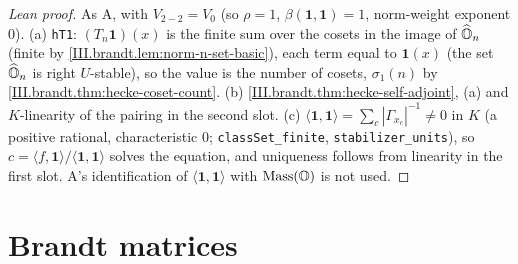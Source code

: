 \begin{proof}[Lean proof]
As A, with $V_{2-2}=V_0$ (so $\rho=1$, $\beta(\mathbf 1,\mathbf 1)=1$, norm-weight exponent $0$). (a) \texttt{hT1}: $(T_n\mathbf 1)(x)$ is the finite sum over the cosets in the image of $\widehat{\mathbb{O}}_n$ (finite by \cref{III.brandt.lem:norm-n-set-basic}), each term equal to $\mathbf 1(x)$ (the set $\widehat{\mathbb{O}}_n$ is right $U$-stable), so the value is the number of cosets, $\sigma_1(n)$ by \cref{III.brandt.thm:hecke-coset-count}. (b) \cref{III.brandt.thm:hecke-self-adjoint}, (a) and $K$-linearity of the pairing in the second slot. (c) $\langle\mathbf 1,\mathbf 1\rangle=\sum_c|\Gamma_{x_c}|^{-1}\neq0$ in $K$ (a positive rational, characteristic $0$; \texttt{classSet\_finite}, \texttt{stabilizer\_units}), so $c=\langle f,\mathbf 1\rangle/\langle\mathbf 1,\mathbf 1\rangle$ solves the equation, and uniqueness follows from linearity in the first slot. A's identification of $\langle\mathbf1,\mathbf1\rangle$ with $\mathrm{Mass}(\mathbb{O})$ is not used.
\end{proof}

\section{Brandt matrices}\label{sec:brandt-brandt}

